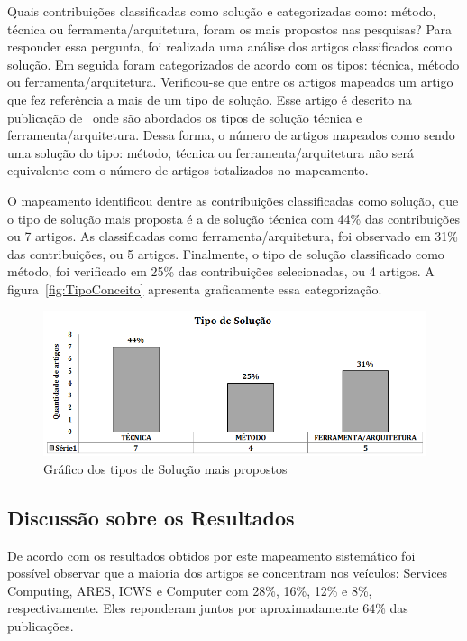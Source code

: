 Quais contribuições classificadas como solução e categorizadas como: método, técnica ou ferramenta/arquitetura, foram os mais propostos nas pesquisas?
Para responder essa pergunta, foi realizada uma análise dos artigos classificados como solução. Em seguida foram categorizados de acordo com os tipos: técnica, método ou ferramenta/arquitetura. Verificou-se que entre os artigos mapeados um artigo que fez referência a mais de um tipo de solução.  Esse artigo é descrito na publicação de~\cite{CrossRealmSOA2012} onde são abordados os tipos de solução técnica e ferramenta/arquitetura. Dessa forma, o número de artigos mapeados como sendo uma solução do tipo: método, técnica ou ferramenta/arquitetura não será equivalente com o número de artigos totalizados no mapeamento.

O mapeamento identificou dentre as contribuições classificadas como solução, que o tipo de solução mais proposta é a de solução técnica com 44\% das contribuições ou 7 artigos. As classificadas como ferramenta/arquitetura, foi observado em 31\% das contribuições, ou 5 artigos. Finalmente, o tipo de solução classificado como método, foi verificado em 25\% das contribuições selecionadas, ou 4 artigos. A figura~\ref{fig:TipoConceito} apresenta graficamente essa categorização.


\begin{figure}[!htb]
\centering
\includegraphics[width=1.0\textwidth]{tipo_solucao.png}
\caption{Gráfico dos tipos de Solução mais propostos}
\label{fig:tipo_solucao}
\end{figure}
\subsection{Discussão sobre os Resultados}

De acordo com os resultados obtidos por este mapeamento sistemático foi possível observar que a maioria dos artigos se concentram nos veículos: Services Computing, ARES, ICWS e Computer com 28\%, 16\%, 12\% e 8\%, respectivamente. Eles reponderam juntos por aproximadamente 64\% das publicações.

